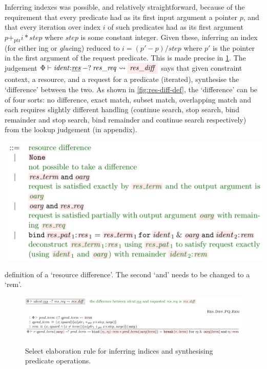 Inferring indexes was possible, and relatively straightforward, because of the
requirement that every predicate had as its first input argument a pointer $p$,
and that every iteration over index $i$ of such predicates had as its first
argument $p +_\mathrm{ptr} i * \mathit{step}$ where $\mathit{step}$ is some
constant integer. Given these, inferring an index (for either
ing or \emph{glue}ing) reduced to $i = (p' - p) /
\mathit{step}$ where $p'$ is the pointer in the first argument of the request
predicate. This is made precise in \cref{fig:res-diff-break}.  The judgement $\Phi \vdash
\mathit{ident}{:}\underline{\mathit{res}} \mathbin{{-}?} \mathit{res\_req}
\rightsquigarrow \outpol{res\_diff}$ says that given constraint context, a
 resource, and a request for a predicate (iterated), synthesise the
`difference' between the two. As shown in \cref{fig:res-diff-def}, the
`difference' can be of four sorts: no difference, exact match, subset match,
overlapping match and each requires slightly different handling (continue
search, stop search, bind remainder and stop search, bind remainder and
continue search respectively) from the lookup judgement (in appendix).

\begin{marginfigure}
    \includegraphics{figures/kernel-elab-res-diff-def}
    \caption{ definition of a `resource difference'. The second
        `and' needs to be changed to a `rem'.}\label{fig:res-diff-def}
\end{marginfigure}

\begin{figure}[tp]
    \includegraphics{figures/kernel-elab-diff-1}
    \includegraphics{figures/kernel-elab-diff-2}
    \caption{Select  elaboration rule for inferring indices and
        synthesising predicate operations.}\label{fig:res-diff-break}
\end{figure}

